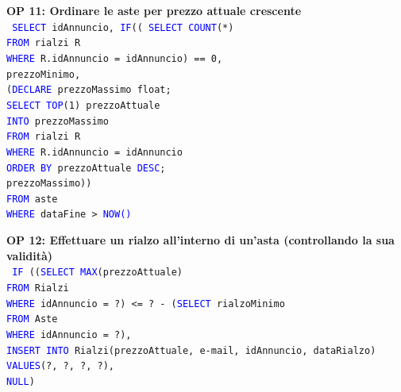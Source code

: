 \documentclass[a4paper,12pt]{report}
\begin{document}
            \noindent
            \textbf{OP 11: Ordinare le aste per prezzo attuale crescente} \\
            \texttt{
                \textcolor{blue}{SELECT} idAnnuncio, \textcolor{blue}{IF}(( \textcolor{blue}{SELECT COUNT}(*) \\
                    \null\qquad\qquad\qquad\qquad\qquad\qquad \textcolor{blue}{FROM} rialzi R \\
                    \null\qquad\qquad\qquad\qquad\qquad\qquad \textcolor{blue}{WHERE} R.idAnnuncio = idAnnuncio) == 0, \\
                    \null\qquad\qquad\qquad\qquad\qquad\qquad prezzoMinimo, \\
                    \null\qquad\qquad\qquad\qquad\qquad\qquad (\textcolor{blue}{DECLARE} prezzoMassimo float; \\
                    \null\qquad\qquad\qquad\qquad\qquad\qquad \textcolor{blue}{SELECT TOP}(1) prezzoAttuale \\
                    \null\qquad\qquad\qquad\qquad\qquad\qquad \textcolor{blue}{INTO} prezzoMassimo \\
                    \null\qquad\qquad\qquad\qquad\qquad\qquad \textcolor{blue}{FROM} rialzi R \\
                    \null\qquad\qquad\qquad\qquad\qquad\qquad \textcolor{blue}{WHERE} R.idAnnuncio = idAnnuncio \\
                    \null\qquad\qquad\qquad\qquad\qquad\qquad \textcolor{blue}{ORDER BY} prezzoAttuale \textcolor{blue}{DESC}; \\
                    \null\qquad\qquad\qquad\qquad\qquad\qquad prezzoMassimo)) \\
                \textcolor{blue}{FROM} aste \\
                \textcolor{blue}{WHERE} dataFine > \textcolor{blue}{NOW()} \\
            }

            \noindent
            \textbf{OP 12: Effettuare un rialzo all’interno di un’asta (controllando la sua validità)} \\
            \texttt{
                \textcolor{blue}{IF} ((\textcolor{blue}{SELECT MAX}(prezzoAttuale) \\
                    \null\qquad \textcolor{blue}{FROM} Rialzi \\
                    \null\qquad \textcolor{blue}{WHERE} idAnnuncio = ?) <= ? - (\textcolor{blue}{SELECT} rialzoMinimo \\
                        \null\qquad\qquad\qquad\qquad\qquad\qquad\qquad\qquad\qquad \textcolor{blue}{FROM} Aste \\
                        \null\qquad\qquad\qquad\qquad\qquad\qquad\qquad\qquad\qquad \textcolor{blue}{WHERE} idAnnuncio = ?), \\
                    \null\qquad \textcolor{blue}{INSERT INTO} Rialzi(prezzoAttuale, e-mail, idAnnuncio, dataRialzo) \\
                    \null\qquad \textcolor{blue}{VALUES}(?, ?, ?, ?), \\ 
                    \null\qquad \textcolor{blue}{NULL}) \\
            }       
            
\end{document}
